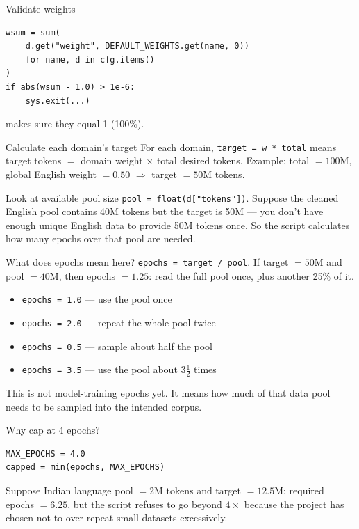 \begin{paragraphblock}{Validate weights}
\begin{lstlisting}[style=shadedpython,breaklines=true]
wsum = sum(
    d.get("weight", DEFAULT_WEIGHTS.get(name, 0))
    for name, d in cfg.items()
)
if abs(wsum - 1.0) > 1e-6:
    sys.exit(...)
\end{lstlisting}
  makes sure they equal 1 (100\%).
\end{paragraphblock}

\begin{paragraphblock}{Calculate each domain's target}
  For each domain, \texttt{target = w * total} means target tokens $=$ domain
  weight $\times$ total desired tokens. Example: total $=100\text{M}$, global
  English weight $=0.50$ $\Rightarrow$ target $=50\text{M}$ tokens.
\end{paragraphblock}

\begin{paragraphblock}{Look at available pool size}
  \texttt{pool = float(d["tokens"])}. Suppose the cleaned English pool
  contains 40M tokens but the target is 50M --- you don't have enough unique
  English data to provide 50M tokens once. So the script calculates how many
  epochs over that pool are needed.
\end{paragraphblock}

\begin{paragraphblock}{What does epochs mean here?}
  \texttt{epochs = target / pool}. If target $=50\text{M}$ and pool
  $=40\text{M}$, then epochs $=1.25$: read the full pool once, plus another
  25\% of it.
  \begin{itemize}
      \setlength{\itemsep}{0pt}
    \item \texttt{epochs = 1.0} --- use the pool once
    \item \texttt{epochs = 2.0} --- repeat the whole pool twice
    \item \texttt{epochs = 0.5} --- sample about half the pool
    \item \texttt{epochs = 3.5} --- use the pool about $3\frac{1}{2}$ times
  \end{itemize}
  This is not model-training epochs yet. It means how much of that data pool
  needs to be sampled into the intended corpus.
\end{paragraphblock}

\begin{paragraphblock}{Why cap at 4 epochs?}
\begin{lstlisting}[style=shadedpython]
MAX_EPOCHS = 4.0
capped = min(epochs, MAX_EPOCHS)
\end{lstlisting}
  Suppose Indian language pool $=2\text{M}$ tokens and target $=12.5\text{M}$:
  required epochs $=6.25$, but the script refuses to go beyond $4\times$
  because the project has chosen not to over-repeat small datasets
  excessively.
\end{paragraphblock}

